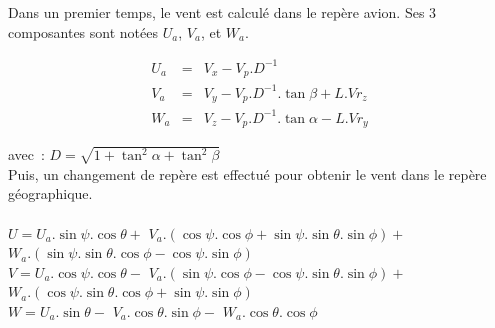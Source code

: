 Dans un premier temps, le vent est calcul\'e dans le 
rep\`ere avion. Ses 3 composantes sont not\'ees $U_a$, $V_a$,
et $W_a$. 

\begin{align*}
U_a & = & V_x - V_p.D^{-1} \\
V_a & = & V_y - V_p.D^{-1}.\tan\beta + L.Vr_z\\
W_a & = & V_z - V_p.D^{-1}.\tan\alpha - L.Vr_y
\end{align*}

avec~: $ D = \sqrt{1+\tan^2\alpha+\tan^2\beta}$\\

Puis, un changement de rep\`ere est effectu\'e pour obtenir le 
vent dans le rep\`ere g\'eographique.\\
\\
$U = U_a.\sin\psi.\cos\theta +$
        $V_a.(\cos\psi.\cos\phi+\sin\psi.\sin\theta.\sin\phi) +$
        $W_a.(\sin\psi.\sin\theta.\cos\phi - \cos\psi.\sin\phi)$ \\   
$V = U_a.\cos\psi.\cos\theta -$
        $V_a.(\sin\psi.\cos\phi - \cos\psi.\sin\theta.\sin\phi) +$
        $W_a.(\cos\psi.\sin\theta.\cos\phi + \sin\psi.\sin\phi)$\\
$W = U_a.\sin\theta -$ 
        $V_a.\cos\theta.\sin\phi -$
        $W_a.\cos\theta.\cos\phi$
\\

